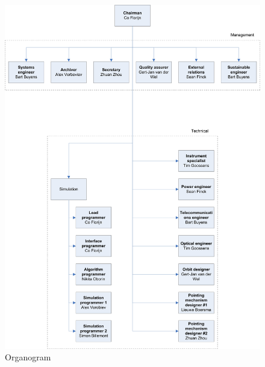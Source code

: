\begin{figure}[H]
\begin{center}

\includegraphics[scale=0.8]{chapters/img/Organogram.jpg}
\caption{Organogram}
\label{organogram}
\end{center}
\end{figure}